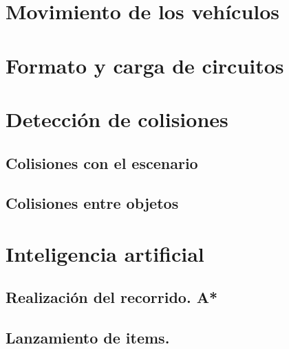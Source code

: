 \section{Movimiento de los vehículos}

\section{Formato y carga de circuitos}

\section{Detección de colisiones}

\subsection{Colisiones con el escenario}

\subsection{Colisiones entre objetos}

\section{Inteligencia artificial}

\subsection{Realización del recorrido. A*}

\subsection{Lanzamiento de items.}
